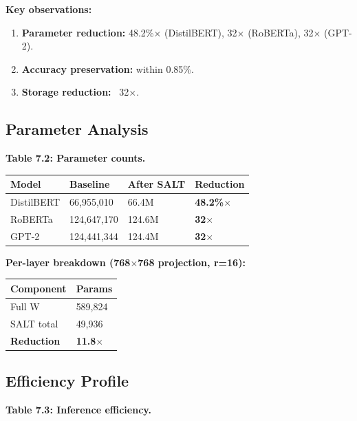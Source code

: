 \textbf{Key observations:}

\begin{enumerate}
\item \textbf{Parameter reduction:} 48.2\%$\times$ (DistilBERT), 32$\times$
  (RoBERTa), 32$\times$ (GPT-2).
\item \textbf{Accuracy preservation:} within 0.85\%.
\item \textbf{Storage reduction:} ~32$\times$.

\end{enumerate}
\subsection{Parameter Analysis}

\textbf{Table 7.2: Parameter counts.}

\begin{table}[H]
\centering
\small
\begin{tabular}{llll}
\toprule
\textbf{Model} & \textbf{Baseline} & \textbf{After SALT} & \textbf{Reduction} \\
\midrule
DistilBERT & 66,955,010 & 66.4M & \textbf{48.2\%$\times$} \\
RoBERTa & 124,647,170 & 124.6M & \textbf{32$\times$} \\
GPT-2 & 124,441,344 & 124.4M & \textbf{32$\times$} \\
\bottomrule
\end{tabular}
\end{table}

\textbf{Per-layer breakdown (768$\times$768 projection, r=16):}

\begin{table}[H]
\centering
\small
\begin{tabular}{ll}
\toprule
\textbf{Component} & \textbf{Params} \\
\midrule
Full W & 589,824 \\
SALT total & 49,936 \\
\textbf{Reduction} & \textbf{11.8$\times$} \\
\bottomrule
\end{tabular}
\end{table}

\subsection{Efficiency Profile}

\textbf{Table 7.3: Inference efficiency.}

